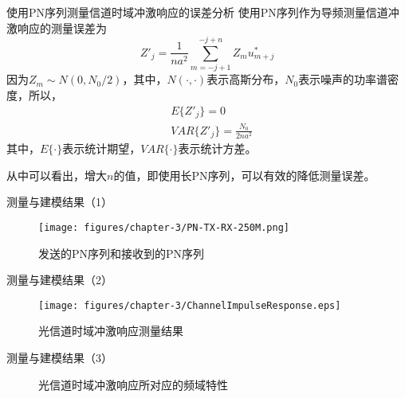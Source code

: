 \documentclass[mathserif, utf8, 9pt]{beamer}
\begin{document}
\begin{frame}{使用PN序列测量信道时域冲激响应的误差分析}
使用PN序列作为导频测量信道冲激响应的测量误差为
\begin{equation}
	Z'_j = \frac{1}{na^2}\sum_{m=-j+1}^{-j+n}Z_mu^*_{m+j}
\end{equation}
因为$Z_m \sim N(0, N_0/2)$，其中，$N(\cdot, \cdot)$表示高斯分布，$N_0$表示噪声的功率谱密度，所以，
\begin{equation}
    \begin{split}
    	& E\{Z'_j\} = 0 \\
    	& VAR\{Z'_j\} = \frac{N_0}{2na^2}
    \end{split}
\end{equation}
其中，$E\{\cdot\}$表示统计期望，$VAR\{\cdot\}$表示统计方差。

从中可以看出，增大$n$的值，即使用长PN序列，可以有效的降低测量误差。
\end{frame}

\begin{frame}{测量与建模结果（1）}
    \begin{figure}[htbp]
        \centering
    	\texttt{[image: figures/chapter-3/PN-TX-RX-250M.png]}
    	\caption{发送的PN序列和接收到的PN序列}
    \end{figure}
\end{frame}

\begin{frame}{测量与建模结果（2）}
    \begin{figure}[htbp]
        \centering
    	\texttt{[image: figures/chapter-3/ChannelImpulseResponse.eps]}
    	\caption{光信道时域冲激响应测量结果}
    \end{figure}
\end{frame}

\begin{frame}{测量与建模结果（3）}
    \begin{figure}[htbp]
        \centering
        \caption{光信道时域冲激响应所对应的频域特性}
    \end{figure}
\end{frame}
\end{document}
